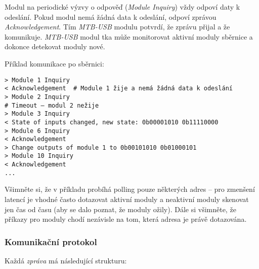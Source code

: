 Modul na periodické výzvy o odpověď (\textit{Module Inquiry}) vždy odpoví daty
k odeslání. Pokud modul nemá žádná data k odeslání, odpoví zprávou
\textit{Acknowledgement}. Tím \textit{MTB-USB} modulu potvrdí, že zprávu přijal
a že komunikuje. \textit{MTB-USB} modul tka může monitorovat aktivní moduly
sběrnice a dokonce detekovat moduly nové.

Příklad komunikace po sběrnici:

\begin{verbatim}
> Module 1 Inquiry
< Acknowledgement  # Module 1 žije a nemá žádná data k odeslání
> Module 2 Inquiry
# Timeout – modul 2 nežije
> Module 3 Inquiry
< State of inputs changed, new state: 0b00001010 0b11110000
> Module 6 Inquiry
< Acknowledgement
> Change outputs of module 1 to 0b00101010 0b01000101
> Module 10 Inquiry
< Acknowledgement
...
\end{verbatim}

Všimněte si, že v příkladu probíhá polling pouze některých adres – pro zmenšení
latencí je vhodné často dotazovat aktivní moduly a neaktivní moduly skenovat
jen čas od času (aby se dalo poznat, že moduly ožily). Dále si všimněte, že
příkazy pro moduly chodí nezávisle na tom, která adresa je právě dotazována.

\subsubsection{Komunikační protokol} \label{subsub:mtbbus-proto-strucure}

Každá \textit{zpráva} má následující strukturu:

